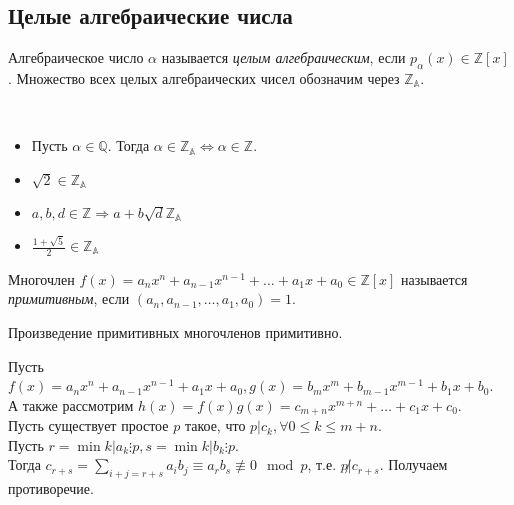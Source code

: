 \subsection{Целые алгебраические числа}

\begin{definition}
	Алгебраическое число $\alpha$ называется \textit{целым алгебраическим}, если $p_{\alpha}(x) \in \mathbb{Z}[x]$. Множество всех целых алгебраических чисел обозначим через $\mathbb{Z}_{\mathbb{A}}$.
\end{definition}

\begin{example}~\
	\begin{itemize}[nolistsep]
		\item Пусть $\alpha \in \mathbb{Q}$. Тогда $\alpha \in \mathbb{Z_{\mathbb{A}}} \Leftrightarrow \alpha \in \mathbb{Z}$.
		\item $\sqrt{2} \in \mathbb{Z_{\mathbb{A}}}$
		\item $a, b, d \in \mathbb{Z} \Rightarrow a + b\sqrt{d} \mathbb{Z_{\mathbb{A}}}$
		\item $\frac{1 + \sqrt{5}}{2} \in \mathbb{Z_{\mathbb{A}}}$
	\end{itemize}
\end{example}

\begin{definition}
	Многочлен $f(x) = a_n x^n + a_{n - 1} x^{n - 1} + \ldots + a_1 x + a_0 \in \mathbb{Z}[x]$ называется \textit{примитивным}, если  $(a_n, a_{n - 1}, \ldots, a_1, a_0) = 1$.
\end{definition}

\begin{lemma}[Гаусса] \label{l11_Gauss_lemma}
	Произведение примитивных многочленов примитивно.
\end{lemma}
\begin{pf}
	Пусть $f(x) = a_n x^n + a_{n - 1}x^{n - 1} + a_1 x + a_0, g(x) = b_m x^m + b_{m - 1} x^{m - 1} + b_1 x + b_0$.\\
	А также рассмотрим $h(x) = f(x) g(x) = c_{m + n} x^{m + n} + \ldots + c_1 x + c_0$.\\
	Пусть существует простое $p$ такое, что $p | c_k, \forall 0 \leq k \leq m + n$.\\
	Пусть $r = \min{k | a_k \vdots p}, s = \min{k | b_k \vdots p}$.\\
	Тогда $\displaystyle c_{r + s } = \sum_{i + j = r + s} a_i b_j \equiv a_r b_s \not \equiv 0 \mod p$, т.е. $p \not | c_{r + s}$. Получаем противоречие.
\end{pf}

